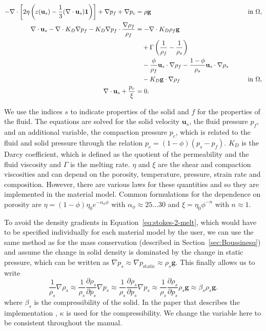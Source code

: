 \documentclass{article}
\begin{document}
\begin{align}
  \label{eq:stokes-1-melt}
  -\nabla \cdot \left[2\eta \left(\varepsilon(\mathbf{u}_s)
                                  - \frac{1}{3}(\nabla \cdot \mathbf{u}_s)\mathbf 1\right)
                \right] + \nabla p_f + \nabla p_c  &=
  \rho \mathbf g
  & \qquad
  & \textrm{in $\Omega$},
  \\
  \label{eq:stokes-2-melt}
  \nabla \cdot \mathbf{u}_s - \nabla \cdot K_D \nabla p_f
  - K_D \nabla p_f \cdot \frac{\nabla \rho_f}{\rho_f}
  &=
  - \nabla \cdot K_D \rho_f \mathbf g
  \notag
  \\
  &\quad
  + \Gamma \left( \frac{1}{\rho_f} - \frac{1}{\rho_s} \right)
  \\
  &\quad
  - \frac{\phi }{\rho_f} \mathbf{u}_s \cdot \nabla\rho_f
  - \frac{1 - \phi }{\rho_s} \mathbf{u}_s \cdot \nabla\rho_s
  \notag
  \\
  &\quad
  - K_D \mathbf g \cdot \nabla \rho_f
  & \qquad
  & \textrm{in $\Omega$},
  \notag
  \\
  \label{eq:stokes-3-melt}
  \nabla \cdot \mathbf{u}_s + \frac{p_c}{\xi}
  &=
  0.
\end{align}

We use the indices $s$ to indicate properties of the solid and $f$ for the properties of the fluid.
The equations are solved for the solid velocity $\mathbf{u}_s$, the fluid pressure $p_f$, and an additional
variable, the compaction pressure $p_c$, which is related to the fluid and solid pressure through the relation
$p_c = (1-\phi) (p_s-p_f)$. $K_D$ is the Darcy coefficient, which is defined as the quotient of the permeability
and the fluid viscosity and $\Gamma$ is the melting rate. $\eta$ and $\xi$ are the shear and compaction viscosities
and can depend on the porosity, temperature, pressure, strain rate and composition. However, there are various
laws for these quantities and so they are implemented in the material model. Common formulations for the dependence
on porosity are $\eta = (1-\phi) \eta_0 e^{-\alpha_\phi \phi}$ with $\alpha_\phi \approx 25...30$ and
$\xi = \eta_0 \phi^{-n}$ with $n \approx 1$.

To avoid the density gradients in Equation~\eqref{eq:stokes-2-melt}, which would have to be specified individually
for each material model by the user, we can use the same method as for the mass conservation (described in Section~\ref{sec:Boussinesq}) and assume the change in solid density is dominated by the change in static pressure,
which can be written as
$\nabla p_s \approx \nabla p_{\text{static}} \approx \rho_s \textbf{g}$.
This finally allows us to write
\begin{equation*}
\frac{1}{\rho_s} \nabla \rho_s
\approx \frac{1}{\rho_s} \frac{\partial \rho_s}{\partial p_s} \nabla p_s
\approx \frac{1}{\rho_s} \frac{\partial \rho_s}{\partial p_s} \nabla p_s
\approx \frac{1}{\rho_s} \frac{\partial \rho_s}{\partial p_s} \rho_s \textbf{g}
\approx \beta_s \rho_s \textbf{g}.
\end{equation*}
where $\beta_s$ is the compressibility of the solid. In the paper that describes the implementation \cite{dannberg_melt}, $\kappa$ is used for the compressibility. We change the variable here to be consistent throughout the manual.
\end{document}
